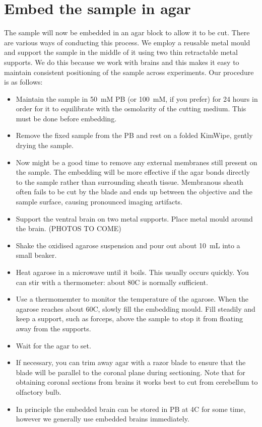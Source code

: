\documentclass[paper=a4, fontsize=11pt]{scrartcl} %
\numberwithin{equation}{section} %
\numberwithin{figure}{section} %
\numberwithin{table}{section} %
\begin{document}
\section{Embed the sample in agar}
The sample will now be embedded in an agar block to allow it to be cut. 
There are various ways of conducting this process.
We employ a reusable metal mould and support the sample in the middle of it using two thin retractable metal supports.
We do this because we work with brains and this makes it easy to maintain consistent positioning of the sample across experiments.
Our procedure is as follows:

\begin{itemize}
\item Maintain the sample in 50~mM PB (or 100~mM, if you prefer) for 24 hours in order for it to equilibrate with the osmolarity of the cutting medium. 
This must be done before embedding. 
\item Remove the fixed sample from the PB and rest on a folded KimWipe, gently drying the sample. 
\item Now might be a good time to remove any external membranes still present on the sample. 
The embedding will be more effective if the agar bonds directly to the sample rather than surrounding sheath tissue. 
Membranous sheath often fails to be cut by the blade and ends up between the objective and the sample surface, causing pronounced imaging artifacts. 
\item Support the ventral brain on two metal supports. Place metal mould around the brain. (PHOTOS TO COME)
\item Shake the oxidised agarose suspension and pour out about 10~mL into a small beaker.
\item Heat agarose in a microwave until it boils.
This usually occurs quickly. 
You can stir with a thermometer: about 80\degree C is normally sufficient.
\item Use a thermomemter to monitor the temperature of the agarose. When the agarose reaches about 60\degree C, 
slowly fill the embedding mould. 
Fill steadily and keep a support, such as forceps, above the sample to stop it from floating away from the supports.
\item Wait for the agar to set.
\item If necessary, you can trim away agar with a razor blade to ensure that the blade will be parallel to the coronal plane during sectioning.
Note that for obtaining coronal sections from brains it works best to cut from cerebellum to olfactory bulb. 
\item In principle the embedded brain can be stored in PB at 4\degree C for some time, however we generally use embedded brains immediately. 
\end{itemize}
\end{document}

